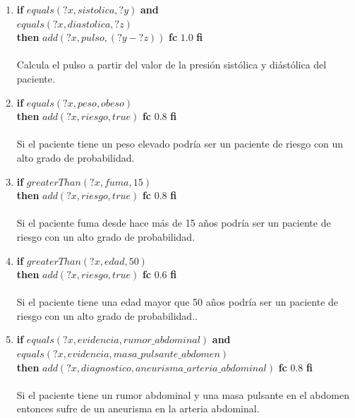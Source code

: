 \documentclass[10pt, a4paper,spanish]{article}
\begin{document}
			\begin{enumerate}[label={\textbf{R\theenumi:}}]

				\item
					\textbf{if} $equals(?x, sistolica, ?y)$ \textbf{and} \\
						\hspace*{0.5cm} $equals(?x, diastolica, ?z)$ \\
					\textbf{then} $add(?x, pulso, (?y - ?z) )$ \textbf{fc} $1.0 $ \textbf{fi}
					\\ \\
					Calcula el pulso a partir del valor de la presión sistólica y diástólica del paciente.

				\item
					\textbf{if} $equals(?x, peso, obeso)$ \\
					\textbf{then} $add(?x, riesgo, true)$ \textbf{fc} $0.8$  \textbf{fi}
					\\ \\
					Si el paciente tiene un peso elevado podría ser un paciente de riesgo con un alto grado de probabilidad.

				\item
					\textbf{if} $greaterThan(?x, fuma, 15)$ \\
					\textbf{then} $add(?x, riesgo, true)$ \textbf{fc} $0.8$  \textbf{fi}
					\\ \\
					Si el paciente fuma desde hace más de 15 años podría ser un paciente de riesgo con un alto grado de probabilidad.

				\item
					\textbf{if} $greaterThan(?x, edad, 50)$ \\
					\textbf{then} $add(?x, riesgo, true)$ \textbf{fc} $0.6$  \textbf{fi}
					\\ \\
					Si el paciente tiene una edad mayor que 50 años podría ser un paciente de riesgo con un alto grado de probabilidad..

				\item
					\textbf{if} $equals(?x, evidencia, rumor\_abdominal)$ \textbf{and} \\
						\hspace*{0.5cm} $equals(?x, evidencia, masa\_pulsante\_abdomen)$ \\
					\textbf{then} $add(?x, diagnostico, aneurisma\_arteria\_abdominal)$ \textbf{fc} $0.8$ \textbf{fi}
					\\ \\
					Si el paciente tiene un rumor abdominal y una masa pulsante en el abdomen entonces sufre de un aneurisma en la arteria abdominal.


\end{enumerate}
\end{document}
